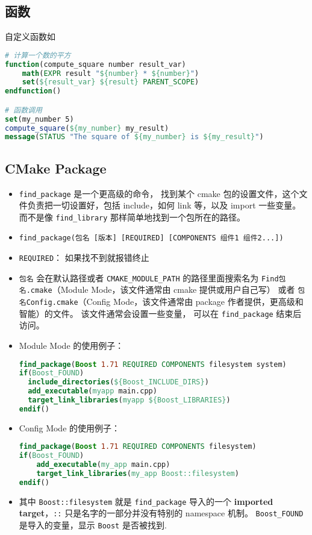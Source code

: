 \subsection{函数}
自定义函数如
\begin{lstlisting}[language=cmake]
# 计算一个数的平方
function(compute_square number result_var)
    math(EXPR result "${number} * ${number}")
    set(${result_var} ${result} PARENT_SCOPE)
endfunction()

# 函数调用
set(my_number 5)
compute_square(${my_number} my_result)
message(STATUS "The square of ${my_number} is ${my_result}")
\end{lstlisting}

\subsection{CMake Package}
\begin{itemize}
\item \verb`find_package` 是一个更高级的命令， 找到某个 cmake 包的设置文件，这个文件负责把一切设置好，包括 include，如何 link 等，以及 import 一些变量。 而不是像 \verb`find_library` 那样简单地找到一个包所在的路径。
\item \verb`find_package(包名 [版本] [REQUIRED] [COMPONENTS 组件1 组件2...])`
\item \verb`REQUIRED`： 如果找不到就报错终止
\item \verb`包名` 会在默认路径或者 \verb`CMAKE_MODULE_PATH` 的路径里面搜索名为 \verb`Find包名.cmake`（Module Mode，该文件通常由 cmake 提供或用户自己写） 或者 \verb`包名Config.cmake`（Config Mode，该文件通常由 package 作者提供，更高级和智能）的文件。 该文件通常会设置一些变量， 可以在 \verb`find_package` 结束后访问。
\item Module Mode 的使用例子：
\begin{lstlisting}[language=cmake]
find_package(Boost 1.71 REQUIRED COMPONENTS filesystem system)
if(Boost_FOUND)
  include_directories(${Boost_INCLUDE_DIRS})
  add_executable(myapp main.cpp)
  target_link_libraries(myapp ${Boost_LIBRARIES})
endif()
\end{lstlisting}
\item Config Mode 的使用例子：
\begin{lstlisting}[language=cmake]
find_package(Boost 1.71 REQUIRED COMPONENTS filesystem)
if(Boost_FOUND)
    add_executable(my_app main.cpp)
    target_link_libraries(my_app Boost::filesystem)
endif()
\end{lstlisting}
\item 其中 \verb`Boost::filesystem` 就是 \verb`find_package` 导入的一个 \textbf{imported target}，\verb`::` 只是名字的一部分并没有特别的 namespace 机制。 \verb`Boost_FOUND` 是导入的变量，显示 \verb`Boost` 是否被找到.
\end{itemize}

